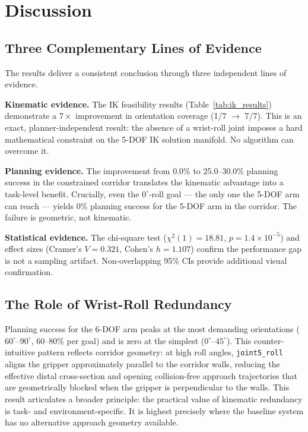 \documentclass[conference]{IEEEtran}
\begin{document}
	
	\section{Discussion}
	\label{sec:discussion}
	
	\subsection{Three Complementary Lines of Evidence}
	
	The results deliver a consistent conclusion through three independent
	lines of evidence.
	
	\textbf{Kinematic evidence.}
	The IK feasibility results (Table~\ref{tab:ik_results}) demonstrate a
	$7\times$ improvement in orientation coverage (1/7 $\rightarrow$ 7/7).
	This is an exact, planner-independent result: the absence of a
	wrist-roll joint imposes a hard mathematical constraint on the 5-DOF IK
	solution manifold. No algorithm can overcome it.
	
	\textbf{Planning evidence.}
	The improvement from 0.0\% to 25.0--30.0\% planning success in the
	constrained corridor translates the kinematic advantage into a
	task-level benefit. Crucially, even the $0^\circ$-roll goal --- the
	only one the 5-DOF arm can reach --- yields 0\% planning success for
	the 5-DOF arm in the corridor. The failure is geometric, not kinematic.
	
	\textbf{Statistical evidence.}
	The chi-square test ($\chi^2(1) = 18.81$, $p = 1.4\times10^{-5}$) and
	effect sizes (Cramer's $V = 0.321$, Cohen's $h = 1.107$) confirm the
	performance gap is not a sampling artifact. Non-overlapping 95\% CIs
	provide additional visual confirmation.
	
	\subsection{The Role of Wrist-Roll Redundancy}
	
	Planning success for the 6-DOF arm peaks at the most demanding
	orientations ($60^\circ$--$90^\circ$, 60--80\% per goal) and is zero
	at the simplest ($0^\circ$--$45^\circ$). This counter-intuitive pattern
	reflects corridor geometry: at high roll angles, \texttt{joint5\_roll}
	aligns the gripper approximately parallel to the corridor walls,
	reducing the effective distal cross-section and opening collision-free
	approach trajectories that are geometrically blocked when the gripper
	is perpendicular to the walls. This result articulates a broader
	principle: the practical value of kinematic redundancy is task- and
	environment-specific. It is highest precisely where the baseline system
	has no alternative approach geometry available.
	
\end{document}
